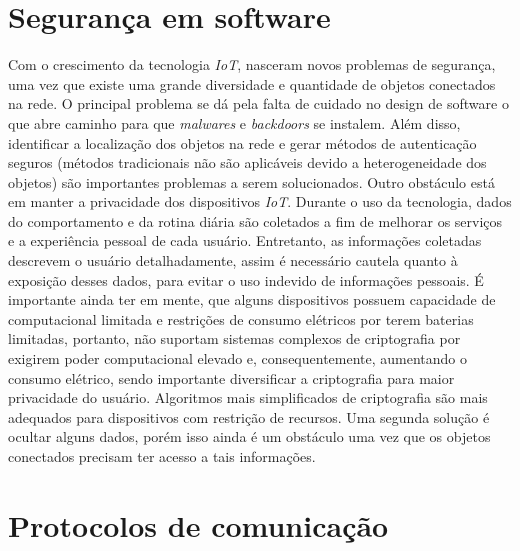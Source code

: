 \documentclass[../../layout.tex]{subfiles}
\begin{document}
\section{Segurança em software}
\hspace*{3em}Com o crescimento da tecnologia \emph{IoT}, nasceram novos problemas de segurança, uma vez que existe uma grande diversidade e quantidade de objetos conectados na rede. O principal problema se dá pela falta de cuidado no design de software o que abre caminho para que \emph{malwares} e \emph{backdoors} se instalem. Além disso, identificar a localização dos objetos na rede e gerar métodos de autenticação seguros (métodos tradicionais não são aplicáveis devido a heterogeneidade dos objetos) são importantes problemas a serem solucionados. Outro obstáculo está em manter a privacidade dos dispositivos \emph{IoT}. Durante o uso da tecnologia, dados do comportamento e da rotina diária são coletados a fim de melhorar os serviços e a experiência pessoal de cada usuário. Entretanto, as informações coletadas descrevem o usuário detalhadamente, assim é necessário cautela quanto à exposição desses dados, para evitar o uso indevido de informações pessoais. 
É importante ainda ter em mente, que alguns dispositivos possuem capacidade de computacional limitada e restrições de consumo elétricos por terem  baterias limitadas, portanto, não suportam  sistemas complexos de criptografia por exigirem poder computacional elevado e, consequentemente, aumentando o consumo elétrico, sendo importante diversificar a criptografia para maior privacidade do usuário. Algoritmos mais simplificados de criptografia são mais adequados para dispositivos com restrição de recursos. Uma segunda solução é ocultar alguns dados, porém isso ainda é um obstáculo uma vez que os objetos conectados precisam ter acesso a tais informações. \cite{seguranca}

\section{Protocolos de comunicação}
\end{document}
